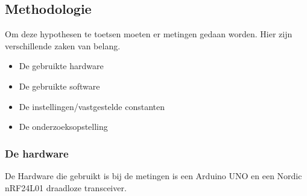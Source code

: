 \documentclass{article}
\begin{document}
\subsection{Methodologie}
Om deze hypothesen te toetsen moeten er metingen gedaan worden. Hier zijn verschillende zaken van belang. 
\begin{itemize}
	\item De gebruikte hardware
	\item De gebruikte software
	\item De instellingen/vastgestelde constanten
	\item De onderzoeksopstelling
\end{itemize}

\subsubsection{De hardware}
De Hardware die gebruikt is bij de metingen is een Arduino UNO en een Nordic nRF24L01 draadloze transceiver.\\

\end{document}
